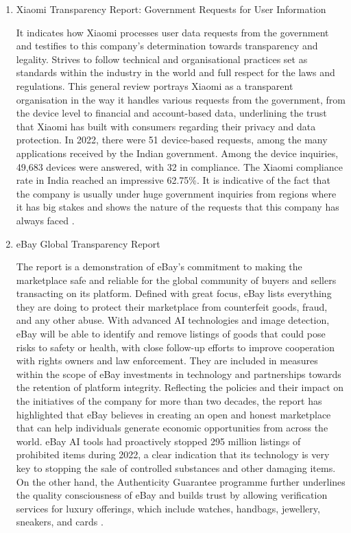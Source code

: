 \begin{enumerate}
\item Xiaomi Transparency Report: Government Requests for User Information 

It indicates how Xiaomi processes user data requests from the government and testifies to this company's determination towards transparency and legality. Strives to follow technical and organisational practices set as standards within the industry in the world and full respect for the laws and regulations. This general review portrays Xiaomi as a transparent organisation in the way it handles various requests from the government, from the device level to financial and account-based data, underlining the trust that Xiaomi has built with consumers regarding their privacy and data protection. In 2022, there were 51 device-based requests, among the many applications received by the Indian government. Among the device inquiries, 49,683 devices were answered, with 32 in compliance. The Xiaomi compliance rate in India reached an impressive 62.75\%. It is indicative of the fact that the company is usually under huge government inquiries from regions where it has big stakes and shows the nature of the requests that this company has always faced \cite{XiaomiTransparencyReport}.
 
\item eBay Global Transparency Report 

 The report is a demonstration of eBay's commitment to making the marketplace safe and reliable for the global community of buyers and sellers transacting on its platform. Defined with great focus, eBay lists everything they are doing to protect their marketplace from counterfeit goods, fraud, and any other abuse. With advanced AI technologies and image detection, eBay will be able to identify and remove listings of goods that could pose risks to safety or health, with close follow-up efforts to improve cooperation with rights owners and law enforcement. They are included in measures within the scope of eBay investments in technology and partnerships towards the retention of platform integrity. Reflecting the policies and their impact on the initiatives of the company for more than two decades, the report has highlighted that eBay believes in creating an open and honest marketplace that can help individuals generate economic opportunities from across the world. eBay AI tools had proactively stopped 295 million listings of prohibited items during 2022, a clear indication that its technology is very key to stopping the sale of controlled substances and other damaging items. On the other hand, the Authenticity Guarantee programme further underlines the quality consciousness of eBay and builds trust by allowing verification services for luxury offerings, which include watches, handbags, jewellery, sneakers, and cards \cite{eBayGlobalTransparencyReport2022}.


\end{enumerate}
